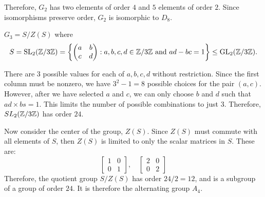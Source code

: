 \begin{enumalph}
\begin{Answer}
      Therefore, $G_2$ has two elements of order $4$ and $5$ elements of order $2$.
      Since isomorphisms preserve order, $G_2$ is isomorphic to $D_8$.
    \end{Answer}
  
  \newpage
  \item $G_3=S/Z(S)$ where
    \[ S=\operatorname{SL}_2(\mathbb{Z}/3\mathbb{Z})=\left\{ \begin{pmatrix} a & b \\ c & d \end{pmatrix} : a,b,c,d
    \in \mathbb{Z}/3\mathbb{Z} \text{ and } ad-bc=1 \right\} \leq \mathrm{GL}_2(\mathbb{Z}/3\mathbb{Z}). \]

    \begin{Answer}
      There are $3$ possible values for each of $a, b, c, d$ without restriction.
      Since the first column must be nonzero,
      we have $3^2 - 1 = 8$ possible choices for the pair $(a, c)$.
      However, after we have selected $a$ and $c$, we can only choose $b$ and $d$
      such that $ad \times bs = 1$. This limits the number of possible combinations to just $3$.
      Therefore, $SL_2(\mathbb{Z}/3\mathbb{Z})$ has order $24$.

      Now consider the center of the group, $Z(S)$. Since $Z(S)$
      must commute with all elements of $S$, then $Z(S)$ is limited
      to only the scalar matrices in $S$.
      These are:
      \[
        \begin{bmatrix}
          1 & 0 \\
          0 & 1
        \end{bmatrix}, \quad
        \begin{bmatrix}
          2 & 0 \\
          0 & 2
        \end{bmatrix}
      \]
      Therefore, the quotient group $S/Z(S)$ has order $24/2 = 12$,
      and is a subgroup of a group of order $24$.
      It is therefore the alternating group $A_4$.      
    \end{Answer}


\end{enumalph}
